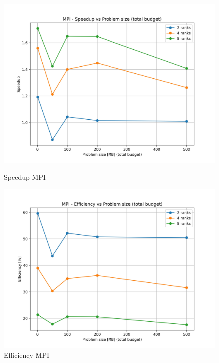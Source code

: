 			\begin{figure}[H]
				\centering
				\begin{minipage}[t]{0.49\textwidth}
					\centering
					\includegraphics[width=\textwidth]{img/mpi_plots/mpi_speedup.jpg}
					\caption{Speedup MPI}
					\label{fig:mpi_speedup}
				\end{minipage}
				\hfill
				\begin{minipage}[t]{0.49\textwidth}
					\centering
					\includegraphics[width=\textwidth]{img/mpi_plots/mpi_efficiency.jpg}
					\caption{Efficiency MPI}
					\label{fig:mpi_efficiency}
				\end{minipage}
			\end{figure}
			
